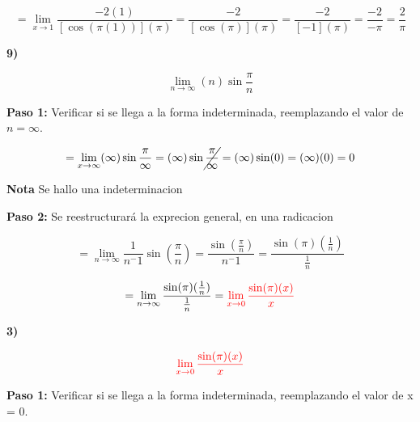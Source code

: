 \documentclass[12pt,a4paper]{article}
\begin{document}
\[
= \lim_{x \to 1} \frac{-2(1)}{[\cos (\pi (1))](\pi)}= \frac{-2}{[\cos (\pi)](\pi)}= \frac{-2}{[-1](\pi)}= \frac{-2}{-\pi}= \frac{2}{\pi}
\]


\newpage

\textbf{9)}

\[
\lim_{n \to \infty} (n) \sin \frac{\pi}{n} 
\]

\vspace{0.2cm}

\textbf{Paso 1:}
\vspace{0.2cm}
Verificar si se llega a la forma indeterminada, reemplazando el valor de $n = \infty $.

\[
= \lim_{x \to \infty} (\infty) \sin \frac{\pi}{\infty} = (\infty) \sin \cancel{\frac{\pi}{\infty}} = (\infty) \sin (0)= (\infty)(0)= 0
\]

\textbf{Nota}
Se hallo una indeterminacion

\vspace{0.5cm}


\vspace{0.5cm}

\textbf{Paso 2:}
Se reestructurará la exprecion general, en una radicacion

\[
= \lim_{n \to \infty} \frac{1}{n^-1} \sin (\frac{\pi}{n})= \frac{\sin (\frac{\pi}{n})}{n^-1}= \frac{\sin (\pi)(\frac{1}{n})}{\frac{1}{n}}
\]


\vspace{0.5cm}


\[
= \lim_{n \to \infty} \frac{\sin (\pi)(\frac{1}{n})}{\frac{1}{n}}= \textcolor{red}{\lim_{x \to 0} \frac{\sin (\pi)(x)}{x}}
\]



\newpage

\textbf{3)}

\[
\textcolor{red}{\lim_{x \to 0} \frac{\sin (\pi)(x)}{x}} 
\]

\vspace{0.2cm}

\textbf{Paso 1:}
\vspace{0.2cm}
Verificar si se llega a la forma indeterminada, reemplazando el valor de x = 0.
\end{document}
